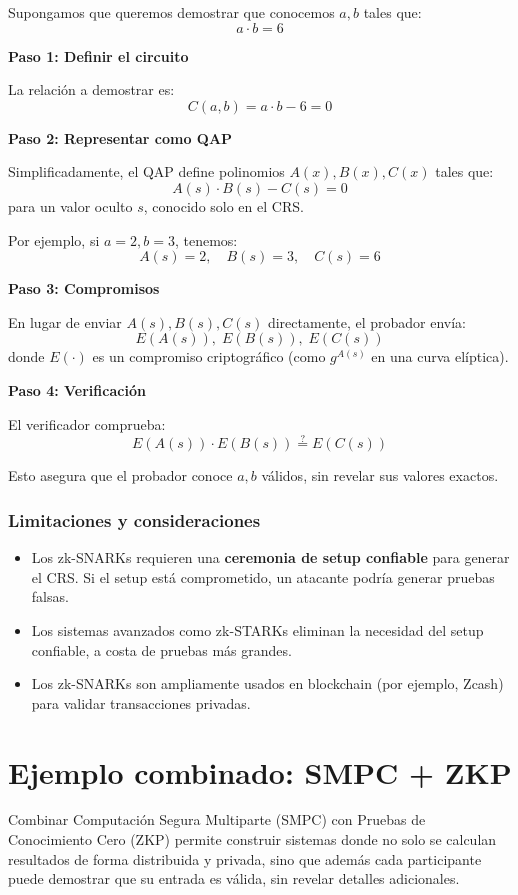 \documentclass{article}
\begin{document}
Supongamos que queremos demostrar que conocemos \( a, b \) tales que:
\[
a \cdot b = 6
\]

\textbf{Paso 1: Definir el circuito}

La relación a demostrar es:
\[
C(a, b) = a \cdot b - 6 = 0
\]

\textbf{Paso 2: Representar como QAP}

Simplificadamente, el QAP define polinomios \( A(x), B(x), C(x) \) tales que:
\[
A(s) \cdot B(s) - C(s) = 0
\]
para un valor oculto \( s \), conocido solo en el CRS.

Por ejemplo, si \( a = 2, b = 3 \), tenemos:
\[
A(s) = 2, \quad B(s) = 3, \quad C(s) = 6
\]

\textbf{Paso 3: Compromisos}

En lugar de enviar \( A(s), B(s), C(s) \) directamente, el probador envía:
\[
E(A(s)), \; E(B(s)), \; E(C(s))
\]
donde \( E(\cdot) \) es un compromiso criptográfico (como \( g^{A(s)} \) en una curva elíptica).

\textbf{Paso 4: Verificación}

El verificador comprueba:
\[
E(A(s)) \cdot E(B(s)) \stackrel{?}{=} E(C(s))
\]

Esto asegura que el probador conoce \( a, b \) válidos, sin revelar sus valores exactos.

\subsubsection{Limitaciones y consideraciones}

\begin{itemize}
    \item Los zk-SNARKs requieren una \textbf{ceremonia de setup confiable} para generar el CRS. Si el setup está comprometido, un atacante podría generar pruebas falsas.
    \item Los sistemas avanzados como zk-STARKs eliminan la necesidad del setup confiable, a costa de pruebas más grandes.
    \item Los zk-SNARKs son ampliamente usados en blockchain (por ejemplo, Zcash) para validar transacciones privadas.
\end{itemize}


\section{Ejemplo combinado: SMPC + ZKP}

Combinar Computación Segura Multiparte (SMPC) con Pruebas de Conocimiento Cero (ZKP) permite construir sistemas donde no solo se calculan resultados de forma distribuida y privada, sino que además cada participante puede demostrar que su entrada es válida, sin revelar detalles adicionales.
\end{document}
